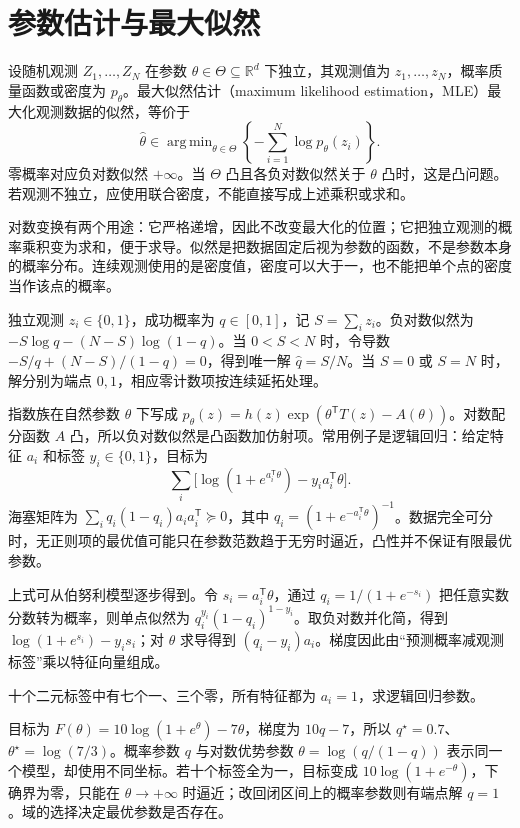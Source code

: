 \documentclass[UTF8,12pt,a4paper,fontset=fandol]{ctexbook}
\begin{document}
\section{参数估计与最大似然}

设随机观测 $Z_1,\ldots,Z_N$ 在参数 $\theta\in\Theta\subseteq\mathbb R^d$ 下独立，其观测值为 $z_1,\ldots,z_N$，概率质量函数或密度为 $p_\theta$。最大似然估计（maximum likelihood estimation，MLE）最大化观测数据的似然，等价于
\begin{equation}
 \widehat\theta\in\mathop{\mathrm{arg\,min}}_{\theta\in\Theta}
 \left\{-\sum_{i=1}^N\log p_\theta(z_i)\right\}.
 \label{eq:co-mle}
\end{equation}
零概率对应负对数似然 $+\infty$。当 $\Theta$ 凸且各负对数似然关于 $\theta$ 凸时，这是凸问题。若观测不独立，应使用联合密度，不能直接写成上述乘积或求和。

对数变换有两个用途：它严格递增，因此不改变最大化的位置；它把独立观测的概率乘积变为求和，便于求导。似然是把数据固定后视为参数的函数，不是参数本身的概率分布。连续观测使用的是密度值，密度可以大于一，也不能把单个点的密度当作该点的概率。

\begin{example}[伯努利参数]
独立观测 $z_i\in\{0,1\}$，成功概率为 $q\in[0,1]$，记 $S=\sum_i z_i$。负对数似然为 $-S\log q-(N-S)\log(1-q)$。当 $0<S<N$ 时，令导数 $-S/q+(N-S)/(1-q)=0$，得到唯一解 $\widehat q=S/N$。当 $S=0$ 或 $S=N$ 时，解分别为端点 $0,1$，相应零计数项按连续延拓处理。
\end{example}

指数族在自然参数 $\theta$ 下写成 $p_\theta(z)=h(z)\exp(\theta^{\mathsf T}T(z)-A(\theta))$。对数配分函数 $A$ 凸，所以负对数似然是凸函数加仿射项。常用例子是逻辑回归：给定特征 $a_i$ 和标签 $y_i\in\{0,1\}$，目标为
\[
 \sum_i\bigl[\log(1+e^{a_i^{\mathsf T}\theta})-y_i a_i^{\mathsf T}\theta\bigr].
\]
海塞矩阵为 $\sum_iq_i(1-q_i)a_i a_i^{\mathsf T}\succeq0$，其中 $q_i=(1+e^{-a_i^{\mathsf T}\theta})^{-1}$。数据完全可分时，无正则项的最优值可能只在参数范数趋于无穷时逼近，凸性并不保证有限最优参数。

上式可从伯努利模型逐步得到。令 $s_i=a_i^{\mathsf T}\theta$，通过 $q_i=1/(1+e^{-s_i})$ 把任意实数分数转为概率，则单点似然为 $q_i^{y_i}(1-q_i)^{1-y_i}$。取负对数并化简，得到 $\log(1+e^{s_i})-y_i s_i$；对 $\theta$ 求导得到 $(q_i-y_i)a_i$。梯度因此由“预测概率减观测标签”乘以特征向量组成。

\begin{example}[只有截距的逻辑回归]
十个二元标签中有七个一、三个零，所有特征都为 $a_i=1$，求逻辑回归参数。
\end{example}
\begin{solve}
目标为 $F(\theta)=10\log(1+e^\theta)-7\theta$，梯度为 $10q-7$，所以 $q^\star=0.7$、$\theta^\star=\log(7/3)$。概率参数 $q$ 与对数优势参数 $\theta=\log(q/(1-q))$ 表示同一个模型，却使用不同坐标。若十个标签全为一，目标变成 $10\log(1+e^{-\theta})$，下确界为零，只能在 $\theta\to+\infty$ 时逼近；改回闭区间上的概率参数则有端点解 $q=1$。域的选择决定最优参数是否存在。
\end{solve}
\end{document}
